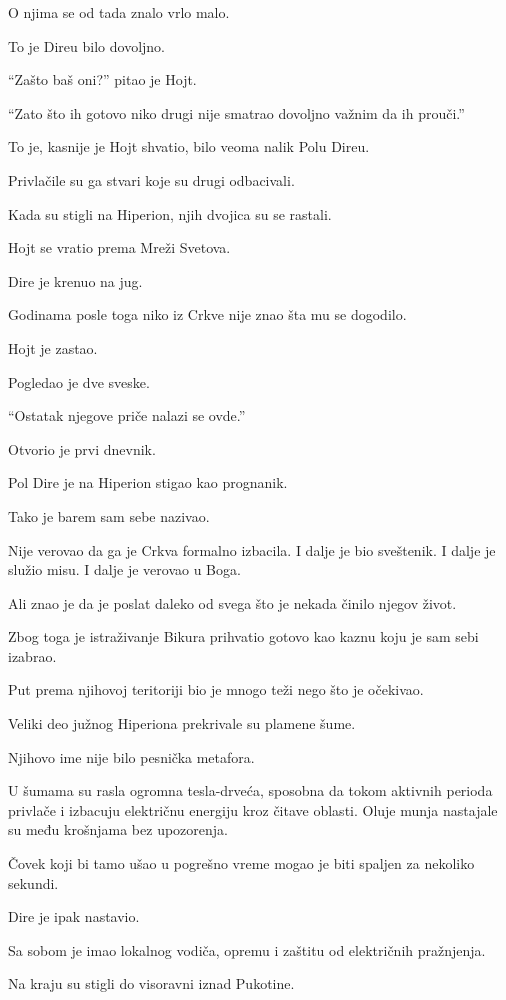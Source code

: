 O njima se od tada znalo vrlo malo.

To je Direu bilo dovoljno.

``Zašto baš oni?'' pitao je Hojt.

``Zato što ih gotovo niko drugi nije smatrao dovoljno važnim da ih prouči.''

To je, kasnije je Hojt shvatio, bilo veoma nalik Polu Direu.

Privlačile su ga stvari koje su drugi odbacivali.

Kada su stigli na Hiperion, njih dvojica su se rastali.

Hojt se vratio prema Mreži Svetova.

Dire je krenuo na jug.

Godinama posle toga niko iz Crkve nije znao šta mu se dogodilo.

Hojt je zastao.

Pogledao je dve sveske.

``Ostatak njegove priče nalazi se ovde.''

Otvorio je prvi dnevnik.

\bigskip

Pol Dire je na Hiperion stigao kao prognanik.

Tako je barem sam sebe nazivao.

Nije verovao da ga je Crkva formalno izbacila. I dalje je bio sveštenik. I dalje je služio misu. I dalje je verovao u Boga.

Ali znao je da je poslat daleko od svega što je nekada činilo njegov život.

Zbog toga je istraživanje Bikura prihvatio gotovo kao kaznu koju je sam sebi izabrao.

Put prema njihovoj teritoriji bio je mnogo teži nego što je očekivao.

Veliki deo južnog Hiperiona prekrivale su plamene šume.

Njihovo ime nije bilo pesnička metafora.

U šumama su rasla ogromna tesla-drveća, sposobna da tokom aktivnih perioda privlače i izbacuju električnu energiju kroz čitave oblasti. Oluje munja nastajale su među krošnjama bez upozorenja.

Čovek koji bi tamo ušao u pogrešno vreme mogao je biti spaljen za nekoliko sekundi.

Dire je ipak nastavio.

Sa sobom je imao lokalnog vodiča, opremu i zaštitu od električnih pražnjenja.

Na kraju su stigli do visoravni iznad Pukotine.

